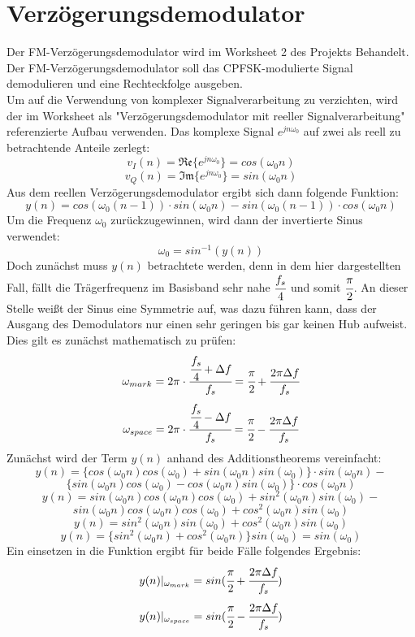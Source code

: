 \documentclass{article}
\begin{document}
\section{Verzögerungsdemodulator} \label{sec:fm-demod}
Der FM-Verzögerungsdemodulator wird im Worksheet 2 des Projekts Behandelt. 
Der FM-Verzögerungsdemodulator soll das CPFSK-modulierte Signal demodulieren und eine Rechteckfolge ausgeben.\\
Um auf die Verwendung von komplexer Signalverarbeitung zu verzichten, wird der im Worksheet als "Verzögerungsdemodulator mit reeller Signalverarbeitung" referenzierte Aufbau verwenden. Das komplexe Signal $e^{jn\omega_0}$ auf zwei als reell zu betrachtende Anteile zerlegt:
$$
v_I(n) = \mathfrak{Re}\{e^{jn\omega_0}\} = cos(\omega_0 n)
$$
$$
v_Q(n) = \mathfrak{Im}\{e^{jn\omega_0}\} = sin(\omega_0 n)
$$
Aus dem reellen Verzögerungsdemodulator ergibt sich dann folgende Funktion:
$$
y(n) = cos(\omega_0 (n-1)) \cdot sin(\omega_0 n) - sin(\omega_0 (n-1)) \cdot cos(\omega_0 n) 
$$
Um die Frequenz $\omega_0$ zurückzugewinnen, wird dann der invertierte Sinus verwendet:
$$
\omega_0 = sin^{-1}(y(n))
$$ 
Doch zunächst muss $y(n)$ betrachtete werden, denn in dem hier dargestellten Fall, fällt die Trägerfrequenz im Basisband sehr nahe $\cfrac{f_s}{4}$ und somit $\cfrac{\pi}{2}$. An dieser Stelle weißt der Sinus eine Symmetrie auf, was dazu führen kann, dass der Ausgang des Demodulators nur einen sehr geringen bis gar keinen Hub aufweist. Dies gilt es zunächst mathematisch zu prüfen:
$$
\omega_{mark} = 2\pi\cdot \cfrac{\cfrac{f_s}{4}+\Delta f}{f_s}=\cfrac{\pi}{2}+\cfrac{2\pi \Delta f}{f_s}
$$
$$
\omega_{space} = 2\pi\cdot \cfrac{\cfrac{f_s}{4}-\Delta f}{f_s}=\cfrac{\pi}{2}-\cfrac{2\pi \Delta f}{f_s}
$$
Zunächst wird der Term $y(n)$ anhand des Additionstheorems vereinfacht:
$$
y(n) = \{cos(\omega_0 n)cos(\omega_0) + sin(\omega_0 n)sin(\omega_0)\} \cdot sin(\omega_0 n) - 
$$
$$
\{sin(\omega_0 n)cos(\omega_0) - cos(\omega_0 n)sin(\omega_0) \} \cdot cos(\omega_0 n) 
$$ 
$$
y(n) = sin(\omega_0 n)cos(\omega_0 n)cos(\omega_0) + sin^2(\omega_0 n)sin(\omega_0) - 
$$
$$
sin(\omega_0 n)cos(\omega_0 n)cos(\omega_0) + cos^2(\omega_0 n)sin(\omega_0) 
$$ 
$$
y(n) = sin^2(\omega_0 n)sin(\omega_0) + cos^2(\omega_0 n)sin(\omega_0) 
$$
$$
y(n) = \{sin^2(\omega_0 n) + cos^2(\omega_0 n)\}sin(\omega_0) = sin(\omega_0)
$$
Ein einsetzen in die Funktion ergibt für beide Fälle folgendes Ergebnis:
$$
y(n)\arrowvert_{\omega_{mark}} = sin(\cfrac{\pi}{2}+\cfrac{2\pi \Delta f}{f_s})
$$
$$
y(n)\arrowvert_{\omega_{space}} = sin(\cfrac{\pi}{2}-\cfrac{2\pi \Delta f}{f_s})
$$
\end{document}
